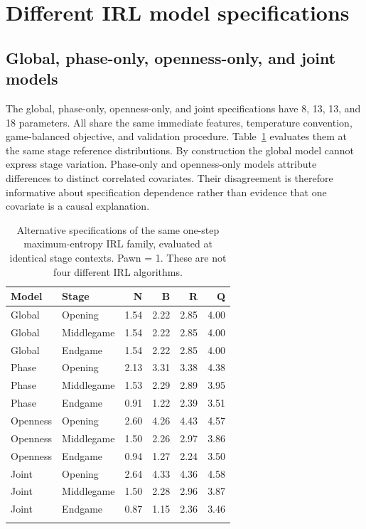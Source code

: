 \documentclass[11pt]{article}
\begin{document}
\FloatBarrier
\section{Different IRL model specifications}
\subsection{Global, phase-only, openness-only, and joint models}
The global, phase-only, openness-only, and joint specifications have 8, 13, 13, and 18 parameters. All share the same immediate features, temperature convention, game-balanced objective, and validation procedure. Table~\ref{tab:family} evaluates them at the same stage reference distributions. By construction the global model cannot express stage variation. Phase-only and openness-only models attribute differences to distinct correlated covariates. Their disagreement is therefore informative about specification dependence rather than evidence that one covariate is a causal explanation.
\begin{table}[htbp]\centering
\small
\caption{Alternative specifications of the same one-step maximum-entropy IRL family, evaluated at identical stage contexts. Pawn = 1. These are not four different IRL algorithms.}\label{tab:family}
\begin{tabular}{llrrrr}
\toprule
Model & Stage & N & B & R & Q\\\midrule
Global & Opening & 1.54 & 2.22 & 2.85 & 4.00\\
Global & Middlegame & 1.54 & 2.22 & 2.85 & 4.00\\
Global & Endgame & 1.54 & 2.22 & 2.85 & 4.00\\
\addlinespace
Phase & Opening & 2.13 & 3.31 & 3.38 & 4.38\\
Phase & Middlegame & 1.53 & 2.29 & 2.89 & 3.95\\
Phase & Endgame & 0.91 & 1.22 & 2.39 & 3.51\\
\addlinespace
Openness & Opening & 2.60 & 4.26 & 4.43 & 4.57\\
Openness & Middlegame & 1.50 & 2.26 & 2.97 & 3.86\\
Openness & Endgame & 0.94 & 1.27 & 2.24 & 3.50\\
\addlinespace
Joint & Opening & 2.64 & 4.33 & 4.36 & 4.58\\
Joint & Middlegame & 1.50 & 2.28 & 2.96 & 3.87\\
Joint & Endgame & 0.87 & 1.15 & 2.36 & 3.46\\
\addlinespace
\bottomrule\end{tabular}\end{table}
\end{document}

